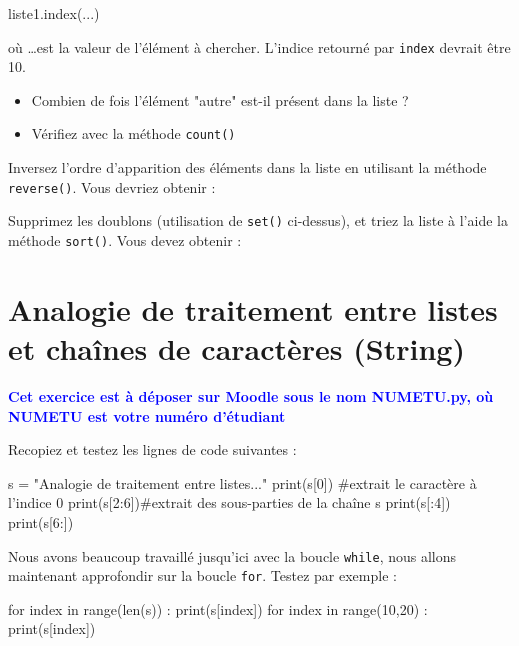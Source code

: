 \begin{python}
 liste1.index(...)
\end{python}

 où \dots est la valeur de l'élément à chercher. L'indice retourné par \texttt{index} devrait être 10.

\begin{itemize}
\item Combien de fois l'élément "autre" est-il présent dans la liste ?
\item Vérifiez avec la méthode \texttt{count()}
\end{itemize}

 Inversez l'ordre d'apparition des éléments dans la liste en utilisant la méthode \texttt{reverse()}. Vous devriez obtenir :

\begin{python}
\end{python}

Supprimez les doublons (utilisation de \texttt{set()} ci-dessus), et triez la liste à l'aide la méthode \texttt{sort()}. Vous devez obtenir :

\begin{python}
\end{python}

\section{Analogie de traitement entre listes et chaînes de caractères (String)}

\textbf{\textcolor{blue}{Cet exercice est à déposer sur Moodle sous le nom NUMETU.py, où NUMETU est votre numéro d'étudiant}}

\exer
 Recopiez et testez les lignes de code suivantes :

\begin{python}
s = "Analogie de traitement entre listes..."
print(s[0]) #extrait le caractère à l'indice 0
print(s[2:6])#extrait des sous-parties de la chaîne s
print(s[:4])
print(s[6:])
\end{python}

Nous avons beaucoup travaillé jusqu'ici avec la boucle \texttt{while}, nous allons maintenant approfondir sur la boucle \texttt{for}. Testez par exemple :
\begin{python}
for index in range(len(s)) :
  print(s[index])
for index in range(10,20) :
  print(s[index])
\end{python}


